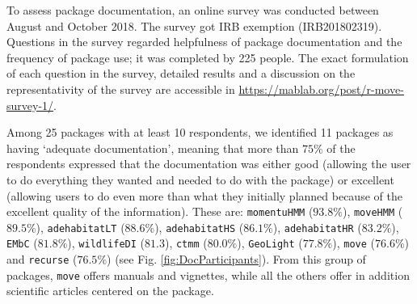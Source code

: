 \documentclass[a4paper,12pt]{article}
\newcommand{\Rpkg}[1]{\texttt{#1}}
\begin{document}
	To assess package documentation, an online survey was conducted between August and October 2018. The survey got IRB exemption (IRB201802319). Questions in the survey regarded helpfulness of package documentation and the frequency of package use; it was completed by 225 people. The exact formulation of each question in the survey, detailed results and a discussion on the representativity of the survey are accessible in \url{https://mablab.org/post/r-move-survey-1/}. %
	
	
	Among 25 packages with at least 10 respondents, we identified 11 packages as having `adequate documentation', meaning that more than $75\%$ of the respondents expressed that the documentation was either good (allowing the user to do everything they wanted and needed to do with the package) or excellent (allowing users to do even more than what they initially planned because of the excellent quality of the information). These are: \Rpkg{momentuHMM} ($93.8\%$), \Rpkg{moveHMM} ($89.5\%$), \Rpkg{adehabitatLT} ($88.6\%$), \Rpkg{adehabitatHS} ($86.1\%$), \Rpkg{adehabitatHR} ($83.2\%$), \Rpkg{EMbC} ($81.8\%$), \Rpkg{wildlifeDI} ($81.3$), \Rpkg{ctmm} ($80.0\%$), \Rpkg{GeoLight} ($77.8\%$), \Rpkg{move} ($76.6\%$) and \Rpkg{recurse} ($76.5\%$) (see Fig. \ref{fig:DocParticipants}). From this group of packages, \Rpkg{move} offers manuals and vignettes, while all the others offer in addition scientific articles centered on the package. %
	
\end{document}
